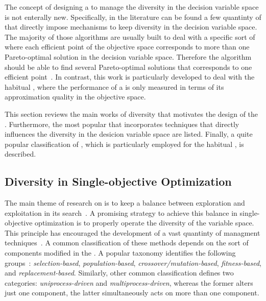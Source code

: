 The concept of designing a \MOEA{} to manage the diversity in the decision variable space is not enterally new.
%
Specifically, in the literature can be found a few quantinty of \MOEAS{} that directly impose mechanisms to keep diversity in the decision variable space.
%
The majority of those algorithms are usually built to deal with a specific sort of \MOPS{} where each efficient point of the objective space corresponds to more than one Pareto-optimal solution in the decision variable space.
%
Therefore the algorithm should be able to find several Pareto-optimal solutions that corresponds to one efficient point~\cite{deb2008omni, cuate2019variation}.
%
In contrast, this work is particularly developed to deal with the habitual \MOPS{}, where the performance of a \MOEA{} is only measured in terms of its approximation quality in the objective space.
%

This section reviews the main works of diversity that motivates the design of the \VSDMOEAD{}.
%
Furthermore, the most popular \MOEAS{} that incorporates techniques that directly influences the diversity in the desicion variable space are listed.
%
Finally, a quite popular classification of \MOEAS{}, which is particularly employed for the habitual \MOPS{}, is described.

\subsection{Diversity in Single-objective Optimization}

The main theme of research on \EAS{} is to keep a balance between exploration and exploitation in its search~\cite{lin2009auto}.
%
A promising strategy to achieve this balance in single-objective optimization is to properly operate the diversity of the variable space.
%
This principle has encouraged the development of a vast quantinty of managment techniques~\cite{pandey2014comparative}.
%
A common classification of these methods depends on the sort of components modified in the \EA{}.
%
A popular taxonomy identifies the following groups~\cite{Joel:Crepinsek}: \textit{selection-based}, \textit{population-based}, \textit{crossover/mutation-based}, \textit{fitness-based}, and \textit{replacement-based}.
%
Similarly, other common classification defines two categories: \textit{uniprocess-driven} and \textit{multiprocess-driven}, whereas the former alters just one component, the latter simultaneously acts on more than one component.
%

